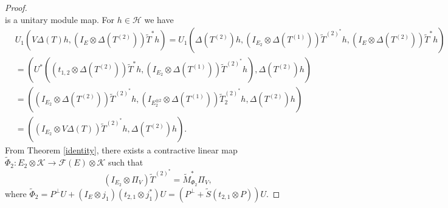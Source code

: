 \documentclass[10pt,a4paper]{amsart}
\newcommand{\ot}{\otimes}
\newcommand{\wT}{\wt{T}}
\newcommand{\wt}{\widetilde}
\begin{document}
\begin{proof}
\[	\] is a unitary module map. For $h\in \mathcal{H}$ we have
	\begin{align*}
		&U_1(V\Delta(T)h,(I_{E}\ot \Delta(T^{(2)}))\wT^{*}h)=U_1(\Delta(T^{(2)})h,  (I_{E_2} \ot \Delta(T^{(1)}))\wT^{(2)^*}h,(I_{E}\ot \Delta(T^{(2)}))\wT^{*}h)\\&=(U^*((t_{1,2}\ot \Delta(T^{(2)}))\wT^{*}h,(I_{E_2}\ot \Delta(T^{(1)}))\wT^{(2)^*}h),\Delta(T^{(2)})h)\\&=((I_{E_2}\ot \Delta(T^{(2)}))\wT^{(2)^*}h,(I_{E_2^{\ot 2}} \ot \Delta(T^{(1)}))\wT_2^{(2)^*}h,\Delta(T^{(2)})h)\\&=((I_{E_2}\ot V\Delta(T))\wT^{(2)^*}h,\Delta(T^{(2)})h).
	\end{align*} From Theorem \ref{identity}, there exists a contractive linear map $\widetilde{\Phi}_2:E_2 \ot \mathcal{K}\to \mathcal{F}(E)\ot \mathcal{K}$ such that $$(I_{E_2}\ot \Pi_V)\wT^{(2)^*}=\widetilde{M}_{{\Phi}_2}^*\Pi_V,$$ where $\widetilde{\Phi}_2=P^{\perp}U+(I_{E}\ot j_1)(t_{2,1}\otimes j_1^*)U=(P^{\perp} + \widetilde{S}(t_{2,1}\otimes P))U.$ 


\end{proof}
\end{document}
